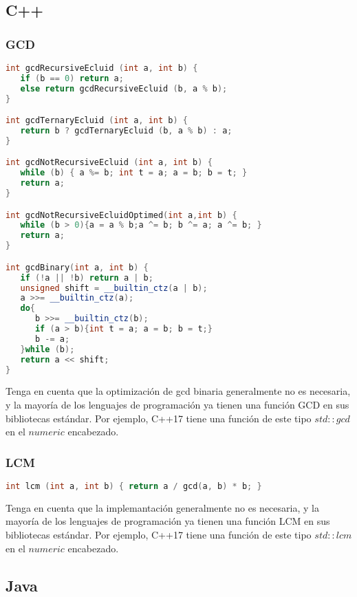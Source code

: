 \subsection{C++}

\subsubsection{GCD}
\begin{lstlisting}[language=C++]
int gcdRecursiveEcluid (int a, int b) {
   if (b == 0) return a;
   else return gcdRecursiveEcluid (b, a % b);
}

int gcdTernaryEcluid (int a, int b) {
   return b ? gcdTernaryEcluid (b, a % b) : a;
}

int gcdNotRecursiveEcluid (int a, int b) {
   while (b) { a %= b; int t = a; a = b; b = t; }
   return a;
}

int gcdNotRecursiveEcluidOptimed(int a,int b) {
   while (b > 0){a = a % b;a ^= b; b ^= a; a ^= b; } 
   return a;
}

int gcdBinary(int a, int b) {
   if (!a || !b) return a | b;
   unsigned shift = __builtin_ctz(a | b);
   a >>= __builtin_ctz(a);
   do{
      b >>= __builtin_ctz(b);
      if (a > b){int t = a; a = b; b = t;}
      b -= a;
   }while (b);
   return a << shift;
}	
\end{lstlisting}

Tenga en cuenta que la optimización de gcd binaria generalmente no es necesaria, y la mayoría de los lenguajes de programación ya tienen una función GCD en sus bibliotecas estándar. Por ejemplo, C++17 tiene una función de este tipo $std::gcd$ en el $numeric$ encabezado.

\subsubsection{LCM}
\begin{lstlisting}[language=C++]
int lcm (int a, int b) { return a / gcd(a, b) * b; }
\end{lstlisting}
Tenga en cuenta que la implemantación generalmente no es necesaria, y la mayoría de los lenguajes de programación ya tienen una función LCM en sus bibliotecas estándar. Por ejemplo, C++17 tiene una función de este tipo $std::lcm$ en el $numeric$ encabezado.

\subsection{Java}

